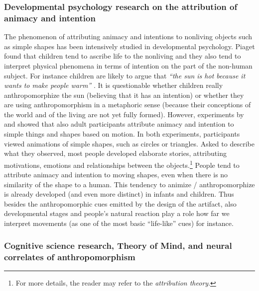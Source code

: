 \documentclass{frontiersSCNS} %
\begin{document}
\subsubsection{Developmental psychology research on the attribution of animacy and intention\\}
\label{sec:developmental-expl}

The phenomenon of attributing animacy and intentions to nonliving objects such
as simple shapes has been intensively studied in developmental psychology.
Piaget found that children tend to ascribe life to the nonliving and they also
tend to interpret physical phenomena in terms of intention on the part of the
non-human subject. For instance children are likely to argue that \textit{``the
sun is hot because it wants to make people warm''} \citep{leeds_childrens_1992}.
It is questionable whether children really anthropomorphize the sun (believing
that it has an intention) or whether they are using anthropomorphism in a
metaphoric sense (because their conceptions of the world and of the living are
not yet fully formed). However, experiments by \cite{heider_experimental_1944}
and \cite{michotte_perception_1963} showed that also adult participants
attribute animacy and intention to simple things and shapes based on motion. In
both experiments, participants viewed animations of simple shapes, such as
circles or triangles. Asked to describe what they observed, most people
developed elaborate stories, attributing motivations, emotions and relationships
between the objects.\footnote{For more details, the reader may refer to the
\emph{attribution theory}.} People tend to attribute animacy and intention
to moving shapes, even when there is no similarity of the shape to a human. This
tendency to animize / anthropomorphize is already developed (and even more
distinct) in infants and children. Thus besides the anthropomorphic cues emitted
by the design of the artifact, also developmental stages and people's natural
reaction play a role how far we interpret movements (as one of the
most basic ``life-like'' cues) for instance.


\subsubsection{Cognitive science research, Theory of Mind, and neural correlates
of anthropomorphism\\}

\label{sec:cognitive-expl}
\end{document}
